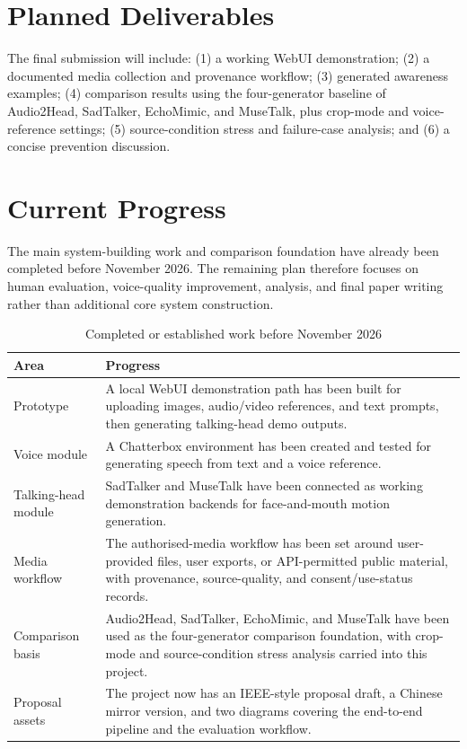 \documentclass[10pt,conference]{IEEEtran}
\begin{document}
\section{Planned Deliverables}
The final submission will include: (1) a working WebUI demonstration; (2) a documented media collection and provenance workflow; (3) generated awareness examples; (4) comparison results using the four-generator baseline of Audio2Head, SadTalker, EchoMimic, and MuseTalk, plus crop-mode and voice-reference settings; (5) source-condition stress and failure-case analysis; and (6) a concise prevention discussion.

\section{Current Progress}
The main system-building work and comparison foundation have already been completed before November 2026. The remaining plan therefore focuses on human evaluation, voice-quality improvement, analysis, and final paper writing rather than additional core system construction.

\begin{table}[H]
\caption{Completed or established work before November 2026}
\label{tab:progress}
\centering
\scriptsize
\begin{tabular}{@{}p{}p{}@{}}
\toprule
\textbf{Area} & \textbf{Progress} \\
\midrule
Prototype & A local WebUI demonstration path has been built for uploading images, audio/video references, and text prompts, then generating talking-head demo outputs. \\
Voice module & A Chatterbox environment has been created and tested for generating speech from text and a voice reference. \\
Talking-head module & SadTalker and MuseTalk have been connected as working demonstration backends for face-and-mouth motion generation. \\
Media workflow & The authorised-media workflow has been set around user-provided files, user exports, or API-permitted public material, with provenance, source-quality, and consent/use-status records. \\
Comparison basis & Audio2Head, SadTalker, EchoMimic, and MuseTalk have been used as the four-generator comparison foundation, with crop-mode and source-condition stress analysis carried into this project. \\
Proposal assets & The project now has an IEEE-style proposal draft, a Chinese mirror version, and two diagrams covering the end-to-end pipeline and the evaluation workflow. \\
\bottomrule
\end{tabular}
\end{table}
\end{document}
